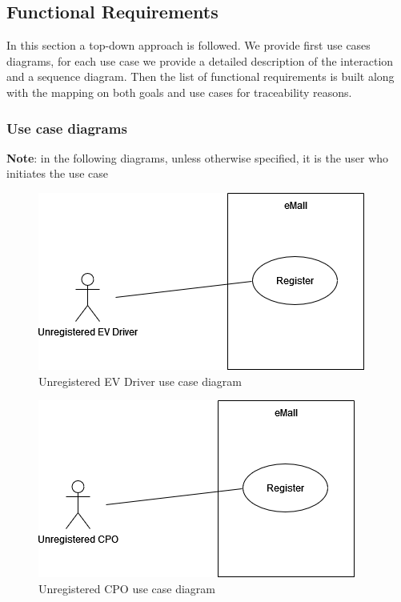 \subsection{Functional Requirements}
In this section a top-down approach is followed. We provide first use cases diagrams, for each use case we provide a detailed description of the interaction and a sequence diagram. Then the list of functional requirements is built along with the mapping on both goals and use cases for traceability reasons.


\subsubsection{Use case diagrams}
\textbf{Note}: in the following diagrams, unless otherwise specified, it is the user who initiates the use case
\vspace*{3cm}
\begin{figure}[H]
    \centering
    \includegraphics[scale=0.6]{src/use_case_diagram/driver_registration.png}
    \caption{Unregistered EV Driver use case diagram}
\end{figure}
\vspace*{3cm}
\begin{figure}[H]
    \centering
    \includegraphics[scale=0.6]{src/use_case_diagram/cpo_registration.png}
    \caption{Unregistered CPO use case diagram}
\end{figure}

